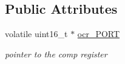 \subsection*{Public Attributes}
\begin{DoxyCompactItemize}
\item 
\hypertarget{classmotor__driver_a960f4685dd5db6cbbe29399dbaf1a8f7}{volatile uint16\-\_\-t $\ast$ \hyperlink{classmotor__driver_a960f4685dd5db6cbbe29399dbaf1a8f7}{ocr\-\_\-\-P\-O\-R\-T}}\label{classmotor__driver_a960f4685dd5db6cbbe29399dbaf1a8f7}

\begin{DoxyCompactList}\small\item\em pointer to the comp register \end{DoxyCompactList}\end{DoxyCompactItemize}
